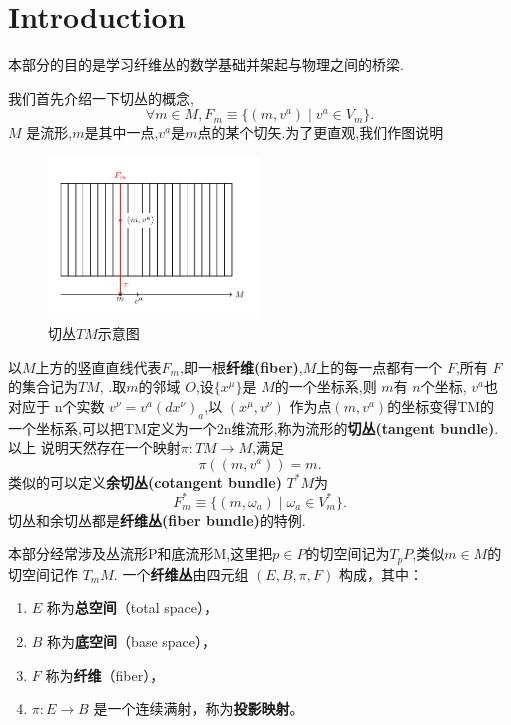 \documentclass[../main.tex]{subfiles}
\begin{document}
 \hypersetup{pageanchor=true}
\chapter*{Introduction}
 本部分的目的是学习纤维丛的数学基础并架起与物理之间的桥梁.

 我们首先介绍一下切丛的概念,\[
 \forall m \in M ,F_m \equiv \{(m,v^a) \mid v^a \in  V_m\}
 .\] $M$ 是流形,$m$是其中一点,$v^a$是$m$点的某个切矢.为了更直观,我们作图说明
 \begin{figure}[htpb]
 \centering
 \includegraphics[width=0.5\textwidth]{../tikzpicture/tangentfiberbundles}
 \caption{切丛$TM$示意图}
 \label{fig:I-0-1}
 \end{figure}

 以$M$上方的竖直直线代表$F_m$,即一根\textbf{纤维(fiber)},$M$上的每一点都有一个 $F$,所有 $F$的集合记为$TM$,
 .取$m$的邻域 $O$,设$\{x^\mu\}$是 $M$的一个坐标系,则 $m$有 $n$个坐标, $v^a$也对应于
 n个实数 $v^\nu = v^a(dx^\nu)_a$,以 $(x^\mu,v^\nu)$ 作为点$(m,v^a)$的坐标变得TM的
 一个坐标系,可以把TM定义为一个2n维流形,称为流形的\textbf{切丛(tangent bundle)}.以上
 说明天然存在一个映射$\pi: TM \to M$,满足\[
 \pi((m,v^a)) = m
 .\]类似的可以定义\textbf{余切丛(cotangent bundle)} $T^* M$为 \[
 F^*_m \equiv \{(m,\omega_a) \mid\omega_a \in V^*_m\} 
 .\] 切丛和余切丛都是\textbf{纤维丛(fiber bundle)}的特例.

 本部分经常涉及丛流形P和底流形M,这里把$p \in P$的切空间记为$T_pP$,类似$m \in  M$的切空间记作 $T_mM$.
一个\textbf{纤维丛}由四元组 \((E, B, \pi, F)\) 构成，其中：
\begin{enumerate}
    \item \(E\) 称为\textbf{总空间}（total space），
    \item \(B\) 称为\textbf{底空间}（base space），
    \item \(F\) 称为\textbf{纤维}（fiber），
    \item \(\pi: E \to B\) 是一个连续满射，称为\textbf{投影映射}。
\end{enumerate}
\end{document}
